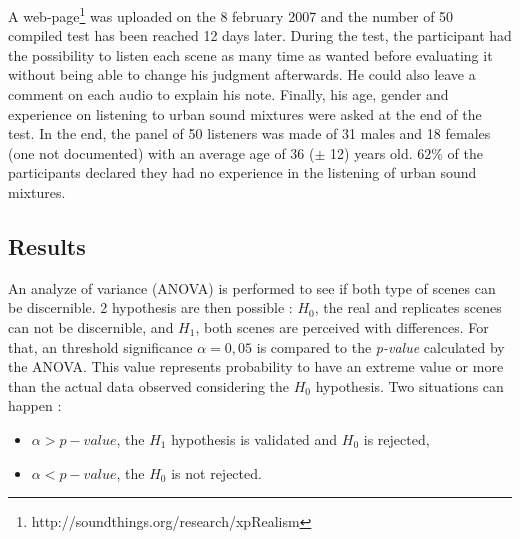 \documentclass[a4,11pt,twocolumn]{article}
\begin{document}
A web-page\footnote{http://soundthings.org/research/xpRealism} was uploaded on the 8 february 2007 and the number of 50 compiled test has been reached 12 days later. During the test, the participant had the possibility to listen each scene as many time as wanted before evaluating it without being able to change his judgment afterwards. He could also leave a comment on each audio to explain his note. Finally, his age, gender and experience on listening to urban sound mixtures were asked at the end of the test. In the end, the panel of 50 listeners was made of 31 males and 18 females (one not documented) with an average age of 36 ($\pm$ 12) years old. $62\%$ of the participants declared they had no experience in the listening of urban sound mixtures.\\



 
\subsection{Results}
 
An analyze of variance (ANOVA) is performed to see if both type of scenes can be discernible. 2 hypothesis are then possible : $H_0$, the real and replicates scenes can not be discernible, and $H_1$, both scenes are perceived with differences. For that, an threshold significance $\alpha=0,05$ is compared to the \textit{p-value} calculated by the ANOVA. This value represents probability to have an extreme value or more than the actual data observed considering the $H_0$ hypothesis. Two situations can happen : 
\begin{itemize}
\item $\alpha > p-value$, the $H_1$ hypothesis is validated and $H_0$ is rejected, 
\item $\alpha < p-value$, the $H_0$ is not rejected.
\end{itemize}
\end{document}
